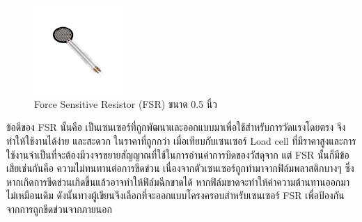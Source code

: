 {\begin{figure}[!ht]
  \centering
  \includegraphics[width=0.3\textwidth]{chapter3/images/FSR.jpg}
  \caption{Force Sensitive Resistor (FSR) ขนาด 0.5 นิ้ว}
  \label{fig:FSR}
\end{figure}

ข้อดีของ FSR นั้นคือ เป็นเซนเซอร์ที่ถูกพัฒนาและออกแบบมาเพื่อใช้สำหรับการวัดแรงโดยตรง จึงทำให้ใช้งานได้ง่าย และสะดวก ในราคาที่ถูกกว่า 
เมื่อเทียบกับเซนเซอร์ Load cell ที่มีราคาสูงและการใช้งานจำเป็นที่จะต้องมีวงจรขยายสัญญาณที่ใช้ในการอ่านค่าการบิดของวัสดุจาก 
แต่ FSR นั้นก็มีข้อเสียเช่นกันคือ ความไม่ทนทานต่อการขีดข่วน เนื่องจากตัวเซนเซอร์ถูกทำมาจากฟิล์มพลาสติกบางๆ ซึ่งหากเกิดการขีดข่วนเกิดขึ้นแล้วอาจทำให้ฟิล์มฉีกขาดได้ 
หากฟิล์มขาดจะทำให้ค่าความต้านทานออกมาไม่เหมือนเดิม ดังนั้นทางผู้เขียนจึงเลือกที่จะออกแบบโครงครอบสำหรับเซนเซอร์ FSR เพื่อป้องกันจากการถูกขีดข่วนจากภายนอก







\clearpage
}
